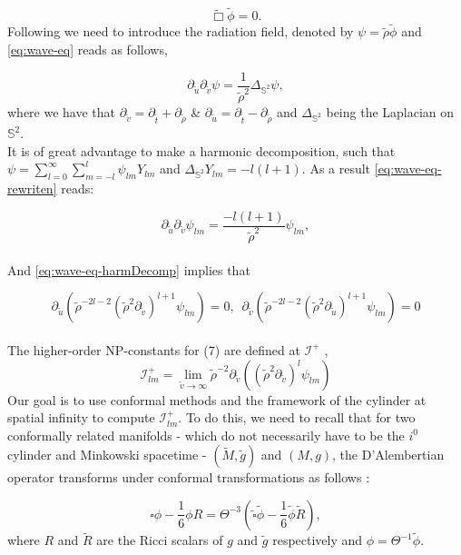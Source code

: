 \documentclass[
11pt, %
english, %
singlespacing, %
headsepline, %
]{MastersDoctoralThesis} %
\begin{document}
\begin{equation}\label{eq:wave-eq}
	\tilde{\Box} \tilde{\phi} = 0.
\end{equation}
Following we need to introduce the radiation field, denoted by $\psi =
\tilde{\rho}\tilde{\phi}$ and \eqref{eq:wave-eq} reads as follows,

\begin{equation}\label{eq:wave-eq-rewriten}
	\partial_{\tilde{u}}\partial_{\tilde{v}}\psi =
        \frac{1}{\tilde{\rho}^2}\Delta_{\mathbb{S}^2}\psi,
\end{equation}
where we have that $\partial_{\tilde{v}} = \partial_{\tilde{t}} +
\partial_{\tilde{\rho}}$ \& $\partial_{\tilde{u}} =
\partial_{\tilde{t}} - \partial_{\tilde{\rho}}$ and
$\Delta_{\mathbb{S}^2}$ being the Laplacian on $\mathbb{S}^2$.\\ It is
of great advantage to make a harmonic decomposition, such that $\psi =
\sum_{l = 0}^{\infty}\sum_{m = -l}^{l}\psi_{lm}Y_{lm}$ and
$\Delta_{\mathbb{S}^2}Y_{lm} = -l(l+1)$. As a result \eqref{eq:wave-eq-rewriten} reads:

\begin{equation}\label{eq:wave-eq-harmDecomp}
	\partial_{\tilde{u}}\partial_{\tilde{v}}\psi_{lm} =
        \frac{-l(l+1)}{\tilde{\rho}^2}\psi_{lm},
\end{equation}
\\ And \eqref{eq:wave-eq-harmDecomp} implies that \cite{GajKehLeo22}

$$\partial_{\tilde{u}}(\tilde{\rho}^{-2l-2}(\tilde{\rho}^2\partial_{\tilde{v}})^{l+1}\psi_{lm})
= 0, \enspace
\partial_{\tilde{v}}(\tilde{\rho}^{-2l-2}(\tilde{\rho}^2\partial_{\tilde{u}})^{l+1}\psi_{lm})
= 0$$ \\ The higher-order NP-constants for (7) are defined at
$\mathscr{I}^+$ \cite{Keh21},
$$\mathcal{I}^+_{lm} = \lim_{\tilde{v} \to \infty}
\tilde{\rho}^{-2}\partial_{\tilde{v}}((\tilde{\rho}^2\partial_{\tilde{v}})^{l}\psi_{lm})$$
Our goal is to use conformal methods and the framework of the cylinder
at spatial infinity to compute $\mathcal{I}^+_{lm}$. To do this, we need
to recall that for two conformally related manifolds - which do not
necessarily have to be the $i^0$ cylinder and Minkowski spacetime -
$(\tilde{M},\tilde{g})$ and $(M,g)$, the D'Alembertian operator
transforms under conformal transformations as follows
\cite{DuaFenGasHil22}:

\begin{equation}\label{eq:waveConfTr}
	\square \phi-\frac{1}{6} \phi R=\Theta^{-3}\left(\tilde{\square} \tilde{\phi}-\frac{1}{6} \tilde{\phi} \tilde{R}\right),
\end{equation}
where $R$ and $\tilde{R}$ are the Ricci scalars of $g$ and $\tilde{g}$ respectively and $\phi = \Theta^{-1}\tilde{\phi}$.
\end{document}
